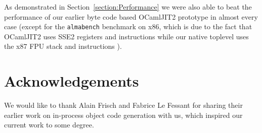 \documentclass[10pt,a4paper,draft,twocolumn]{article}
\begin{document}
As demonstrated in Section~\ref{section:Performance} we were also able to beat the performance of
our earlier byte code based OCamlJIT2 prototype in almost every case (except for the \texttt{almabench}
benchmark on x86, which is due to the fact that OCamlJIT2 uses SSE2 registers and instructions while
our native toplevel uses the x87 FPU stack and instructions \cite{Meurer10jit}).


\section*{Acknowledgements} \label{section:Acknowledgements}

We would like to thank Alain Frisch and Fabrice Le Fessant for sharing their earlier work on
in-process object code generation with us, which inspired our current work to some degree.




\end{document}
